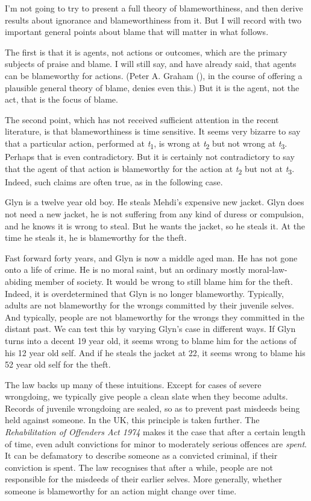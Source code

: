 \documentclass[
  10pt,
  letterpaper,
  twoside]{scrbook}
\begin{document}
I'm not going to try to present a full theory of blameworthiness, and
then derive results about ignorance and blameworthiness from it. But I
will record with two important general points about blame that will
matter in what follows.

The first is that it is agents, not actions or outcomes, which are the
primary subjects of praise and blame. I will still say, and have already
said, that agents can be blameworthy for actions. (Peter A. Graham
(), in the course of offering a plausible
general theory of blame, denies even this.) But it is the agent, not the
act, that is the focus of blame.

The second point, which has not received sufficient attention in the
recent literature, is that blameworthiness is time sensitive. It seems
very bizarre to say that a particular action, performed at
\emph{t}\textsubscript{1}, is wrong at \emph{t}\textsubscript{2} but not
wrong at \emph{t}\textsubscript{3}. Perhaps that is even contradictory.
But it is certainly not contradictory to say that the agent of that
action is blameworthy for the action at \emph{t}\textsubscript{2} but
not at \emph{t}\textsubscript{3}. Indeed, such claims are often true, as
in the following case.

{Glyn} is a twelve year old boy. He steals {Mehdi}'s expensive new
jacket. {Glyn} does not need a new jacket, he is not suffering from any
kind of duress or compulsion, and he knows it is wrong to steal. But he
wants the jacket, so he steals it. At the time he steals it, he is
blameworthy for the theft.

Fast forward forty years, and {Glyn} is now a middle aged man. He has
not gone onto a life of crime. He is no moral saint, but an ordinary
mostly moral-law-abiding member of society. It would be wrong to still
blame him for the theft. Indeed, it is overdetermined that {Glyn} is no
longer blameworthy. Typically, adults are not blameworthy for the wrongs
committed by their juvenile selves. And typically, people are not
blameworthy for the wrongs they committed in the distant past. We can
test this by varying {Glyn}'s case in different ways. If {Glyn} turns
into a decent 19 year old, it seems wrong to blame him for the actions
of his 12 year old self. And if he steals the jacket at 22, it seems
wrong to blame his 52 year old self for the theft.

The law backs up many of these intuitions. Except for cases of severe
wrongdoing, we typically give people a clean slate when they become
adults. Records of juvenile wrongdoing are sealed, so as to prevent past
misdeeds being held against someone. In the UK, this principle is taken
further. The \emph{Rehabilitation of Offenders Act 1974} makes it the
case that after a certain length of time, even adult convictions for
minor to moderately serious offences are \emph{spent}. It can be
defamatory to describe someone as a convicted criminal, if their
conviction is spent. The law recognises that after a while, people are
not responsible for the misdeeds of their earlier selves. More
generally, whether someone is blameworthy for an action might change
over time.
\end{document}
